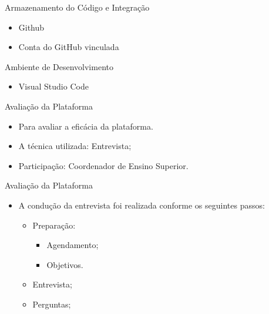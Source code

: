 \begin{frame}{Armazenamento do Código e Integração}
    \begin{itemize}
        \item Github \vspace{0.5cm}
        \item Conta do GitHub vinculada \vspace{0.5cm}
    \end{itemize}
\end{frame}

\begin{frame}{Ambiente de Desenvolvimento}
    \begin{itemize}
        \item Visual Studio Code \vspace{0.5cm}
    \end{itemize}
\end{frame}

\begin{frame}{Avaliação da Plataforma}
    \begin{itemize}
        \item Para avaliar a eficácia da plataforma. \vspace{0.5cm}
        \item A técnica utilizada: Entrevista; \vspace{0.5cm}
        \item Participação: Coordenador de Ensino Superior.
    \end{itemize}
\end{frame}

\begin{frame}{Avaliação da Plataforma}
    \begin{itemize}
        \item A condução da entrevista foi realizada conforme os seguintes passos: \vspace{0.5cm}
              \begin{itemize}
                  \item Preparação: \vspace{0.5cm}
                        \begin{itemize}
                            \item Agendamento; \vspace{0.5cm}
                            \item Objetivos. \vspace{0.5cm}
                        \end{itemize}
                  \item Entrevista; \vspace{0.5cm}
                  \item Perguntas; \vspace{0.5cm}
              \end{itemize}
    \end{itemize}
\end{frame}

